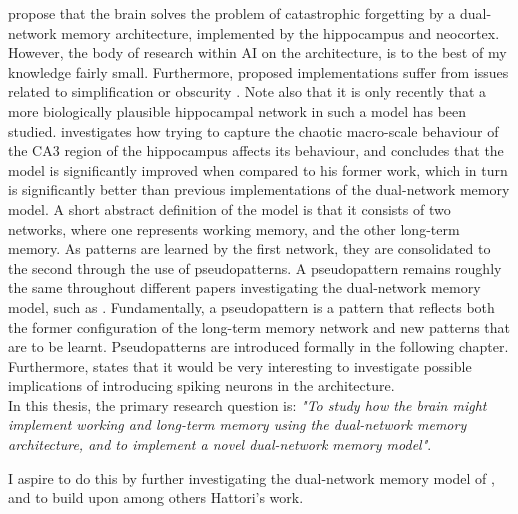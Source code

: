 
\citet{McClelland1995} propose that the brain solves the problem of catastrophic forgetting by a dual-network memory architecture, implemented by the hippocampus and neocortex. However, the body of research within AI on the architecture, is to the best of my knowledge fairly small. Furthermore, proposed implementations suffer from issues related to simplification or obscurity \citep{French1997, French2001, Hattori2010, Hattori2014}. Note also that it is only recently that a more biologically plausible hippocampal network in such a model has been studied. \citet{Hattori2014} investigates how trying to capture the chaotic macro-scale behaviour of the CA3 region of the hippocampus affects its behaviour, and concludes that the model is significantly improved when compared to his former work, which in turn is significantly better than previous implementations of the dual-network memory model. A short abstract definition of the model is that it consists of two networks, where one represents working memory, and the other long-term memory. As patterns are learned by the first network, they are consolidated to the second through the use of pseudopatterns. A pseudopattern remains roughly the same throughout different papers investigating the dual-network memory model, such as \citep{French1997, Ans2000, French2001, Hattori2010, Hattori2014}. Fundamentally, a pseudopattern is a pattern that reflects both the former configuration of the long-term memory network and new patterns that are to be learnt. Pseudopatterns are introduced formally in the following chapter.
Furthermore, \cite{Hattori2014} states that it would be very interesting to investigate possible implications of introducing spiking neurons in the architecture.
\\

In this thesis, 
the primary research question is: \textit{"To study how the brain might implement working and long-term memory using the dual-network memory architecture, and to implement a novel dual-network memory model"}.

I aspire to do this by further investigating the dual-network memory model of \citep{Hattori2014}, and to build upon among others Hattori's work.
\\

